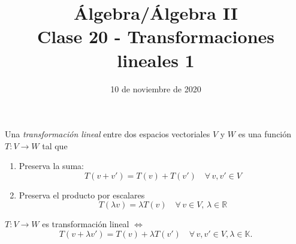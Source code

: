 \documentclass[handout]{beamer} %
\title[Clase 20 - Transformaciones lineales 1]{Álgebra/Álgebra II \\ Clase 20 - Transformaciones lineales 1}
\author[]{}
\institute[]{\normalsize FAMAF / UNC
	\\[\baselineskip] ${}^{}$
	\\[\baselineskip]
}
\date[10/11/2020]{10 de noviembre de 2020}
\newcommand{\R}{\mathbb R}
\newcommand{\K}{\mathbb K}
\begin{document}
\begin{frame}
\maketitle
\end{frame}

\begin{frame}
    \begin{definicion}
    Una \textit{transformación lineal} entre dos espacios vectoriales $V$ y $W$ es una función $T:V\longrightarrow W$ tal que \pause
    \begin{enumerate}
     \item Preserva la suma: 
     $$
     T(v+v')=T(v)+T(v')
     \quad\forall\,v,v'\in V
     $$\pause
     \item Preserva el producto por escalares
     $$
     T(\lambda v)=\lambda T(v)
     \quad\forall\,v\in V,\,\lambda\in\R
     $$ 
    \end{enumerate}
    
    \end{definicion}
    \pause
    \begin{observacion}
        $T:V\longrightarrow W$  es transformación lineal  $\Leftrightarrow$ 
        $$
        T(v+\lambda v')=T(v)+\lambda T(v')\quad\forall\,v,v'\in V, \lambda \in \K.
        $$
    
    \end{observacion}
    
\end{frame}

\end{document}
